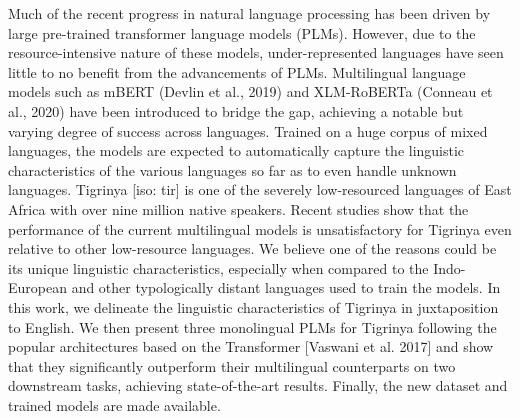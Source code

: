 Much of the recent progress in natural language processing has been driven by large pre-trained transformer language models (PLMs). However, due to the resource-intensive nature of these models, under-represented languages have seen little to no benefit from the advancements of PLMs. Multilingual language models such as mBERT (Devlin et al., 2019) and XLM-RoBERTa (Conneau et al., 2020) have been introduced to bridge the gap, achieving a notable but varying degree of success across languages. Trained on a huge corpus of mixed languages, the models are expected to automatically capture the linguistic characteristics of the various languages so far as to even handle unknown languages. Tigrinya [iso: tir] is one of the severely low-resourced languages of East Africa with over nine million native speakers. Recent studies show that the performance of the current multilingual models is unsatisfactory for Tigrinya even relative to other low-resource languages. We believe one of the reasons could be its unique linguistic characteristics, especially when compared to the Indo-European and other typologically distant languages used to train the models. In this work, we delineate the linguistic characteristics of Tigrinya in juxtaposition to English. We then present three monolingual PLMs for Tigrinya following the popular architectures based on the Transformer [Vaswani et al. 2017] and show that they significantly outperform their multilingual counterparts on two downstream tasks, achieving state-of-the-art results. Finally, the new dataset and trained models are made available.
